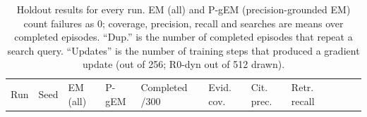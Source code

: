 \begin{longtable}[]{@{}
  >{\raggedright\arraybackslash}p{}
  >{\raggedright\arraybackslash}p{}
  >{\raggedright\arraybackslash}p{}
  >{\raggedright\arraybackslash}p{}
  >{\raggedright\arraybackslash}p{}
  >{\raggedright\arraybackslash}p{}
  >{\raggedright\arraybackslash}p{}
  >{\raggedright\arraybackslash}p{}
  >{\raggedright\arraybackslash}p{}
  >{\raggedright\arraybackslash}p{}
  >{\raggedright\arraybackslash}p{}@{}}
\caption{Holdout results for every run. EM (all) and P-gEM
(precision-grounded EM) count failures as 0; coverage, precision, recall
and searches are means over completed episodes. ``Dup.'' is the number
of completed episodes that repeat a search query. ``Updates'' is the
number of training steps that produced a gradient update (out of 256;
R0-dyn out of 512 drawn).}\label{tbl:4.1}\tabularnewline
\toprule\noalign{}
\begin{minipage}[b]{\linewidth}\raggedright
Run
\end{minipage} & \begin{minipage}[b]{\linewidth}\raggedright
Seed
\end{minipage} & \begin{minipage}[b]{\linewidth}\raggedright
EM (all)
\end{minipage} & \begin{minipage}[b]{\linewidth}\raggedright
P-gEM
\end{minipage} & \begin{minipage}[b]{\linewidth}\raggedright
Completed /300
\end{minipage} & \begin{minipage}[b]{\linewidth}\raggedright
Evid. cov.
\end{minipage} & \begin{minipage}[b]{\linewidth}\raggedright
Cit. prec.
\end{minipage} & \begin{minipage}[b]{\linewidth}\raggedright
Retr. recall
\end{minipage} & \begin{minipage}[b]{\linewidth}\raggedright

\end{minipage}
\end{longtable}
